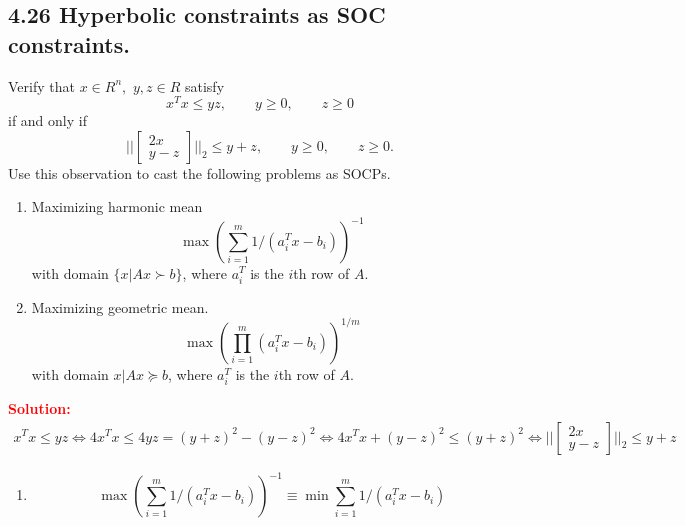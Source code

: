 \begin{latin}

\section{4.26 Hyperbolic constraints as SOC constraints.}

Verify that $ x \in R^{n}, $ $ y, z \in R $ satisfy
\begin{equation*}
	x^{T}x \leq yz, \qquad y \geq 0, \qquad z \geq 0
\end{equation*}
if and only if
\begin{equation*}
	\Bigg|\Bigg|\begin{bmatrix}
		2x 
		\\
		y-z
	\end{bmatrix}\Bigg|\Bigg|_{2} \leq y + z, \qquad y \geq 0, \qquad z \geq 0.
\end{equation*}
Use this observation to cast the following problems as SOCPs.
\begin{enumerate}
	\item Maximizing harmonic mean
		\begin{equation*}
			\max (\sum_{i=1}^{m} 1/(a^{T}_{i} x - b_{i}))^{-1} 
		\end{equation*}
	with domain $ \{x | Ax \succ b\} $, where $ a^{T}_{i} $ is the $ i $th row of $ A $.
	\item Maximizing geometric mean.
		\begin{equation*}
			\max (\prod_{i=1}^{m} (a^{T}_{i} x - b_{i}))^{1/m}
		\end{equation*}
	with domain $ {x | Ax \succeq b} $, where $ a^{T}_{i} $ is the $ i $th row of $ A $.
\end{enumerate}
\textcolor{red}{\textbf{Solution:}}
\\
\begin{gather*}
	x^{T}x \leq yz \Leftrightarrow 4 x^{T}x \leq 4yz = (y+z)^{2} - (y-z)^{2} \Leftrightarrow 4 x^{T}x + (y-z)^{2} \leq (y+z)^{2} \Leftrightarrow \Bigg|\Bigg|\begin{bmatrix}
		2x 
		\\
		y-z
	\end{bmatrix}\Bigg|\Bigg|_{2} \leq y + z
\end{gather*}
\begin{enumerate}
	\item
		\begin{equation*}
			\max (\sum_{i=1}^{m} 1/(a^{T}_{i} x - b_{i}))^{-1} \equiv \min \sum_{i=1}^{m} 1/(a^{T}_{i} x - b_{i})
		\end{equation*}

\end{enumerate}
\end{latin}
